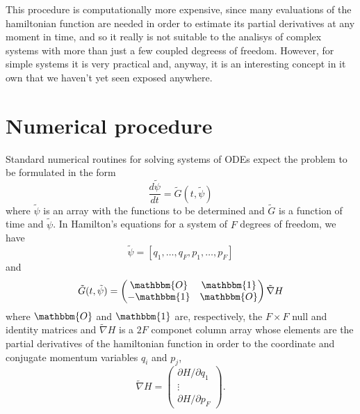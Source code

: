 \documentclass{iopart}
\begin{document}
This procedure is computationally more expensive, since many evaluations of the
hamiltonian function are needed in order to estimate its partial derivatives at
any moment in time, and so it really is not suitable to the analisys of complex
systems with more than just a few coupled degreess of freedom. However, for
simple systems it is very practical and, anyway, it is an interesting concept in
it own that we haven't yet seen exposed anywhere.

\section{Numerical procedure}
Standard numerical routines for solving systems of ODEs expect the problem to be
formulated in the form
\begin{equation}\label{eq:s_ode}
  \frac{d\tilde{\psi}}{dt}=\tilde{G}(t,
  \tilde{\psi})
\end{equation}
where $\tilde\psi$ is an array with the functions to be determined and $\tilde
G$ is a function of time and $\tilde\psi$. In Hamilton's equations for a system
of $F$ degrees of freedom, we have
\begin{equation}
  \tilde\psi=[q_1, \ldots, q_F, p_1, \ldots, p_F]
\end{equation}
and
\begin{equation}
  \tilde G(t, \tilde\psi)=
  \begin{pmatrix}
    \mathbbm{O}&\mathbbm{1}\\-\mathbbm{1}&\mathbbm{O}
  \end{pmatrix}\tilde\nabla H
\end{equation}
where $\mathbbm{O}$ and $\mathbbm{1}$ are, respectively, the $F\times F$ null
and identity matrices and $\tilde\nabla H$ is a $2F$ componet column array whose
elements are the
partial derivatives of the hamiltonian function in order to the coordinate and 
conjugate momentum variables $q_i$ and $p_j$,
\begin{equation}
  \tilde\nabla H = 
  \begin{pmatrix}
    \partial H/\partial q_1\\
    \vdots\\
    \partial H/\partial p_F
  \end{pmatrix}.
\end{equation}
\end{document}
